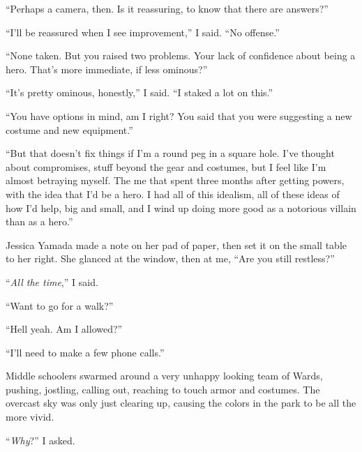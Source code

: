 ``Perhaps a camera, then.  Is it reassuring, to know that there are answers?''



``I'll be reassured when I see improvement,'' I said.  ``No offense.''



``None taken.  But you raised two problems.  Your lack of confidence about being a hero.  That's more immediate, if less ominous?''



``It's pretty ominous, honestly,'' I said.  ``I staked a lot on this.''



``You have options in mind, am I right?  You said that you were suggesting a new costume and new equipment.''



``But that doesn't fix things if I'm a round peg in a square hole.  I've thought about compromises, stuff beyond the gear and costumes, but I feel like I'm almost betraying myself.  The me that spent three months after getting powers, with the idea that I'd be a hero.  I had all of this idealism, all of these ideas of how I'd help, big and small, and I wind up doing more good as a notorious villain than as a hero.''



Jessica Yamada made a note on her pad of paper, then set it on the small table to her right.  She glanced at the window, then at me, ``Are you still restless?''



``\emph{All the time},'' I said.



``Want to go for a walk?''



``Hell yeah.  Am I allowed?''



``I'll need to make a few phone calls.''



\sectionbreak



Middle schoolers swarmed around a very unhappy looking team of Wards, pushing, jostling, calling out, reaching to touch armor and costumes.  The overcast sky was only just clearing up, causing the colors in the park to be all the more vivid.



``\emph{Why}?'' I asked.




